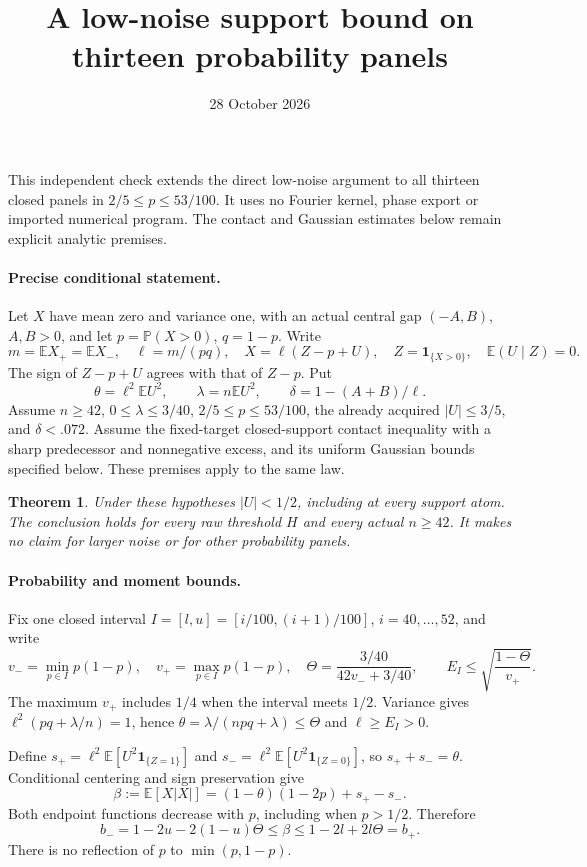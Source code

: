 \documentclass[10pt]{article}
\title{A low-noise support bound on thirteen probability panels}
\author{}\date{28 October 2026}
\newcommand{\E}{\mathbb E}\newcommand{\Pp}{\mathbb P}
\newtheorem{theorem}{Theorem}
\begin{document}
\maketitle
\noindent This independent check extends the direct low-noise argument to
all thirteen closed panels in \(2/5\le p\le53/100\). It uses no Fourier
kernel, phase export or imported numerical program. The contact and
Gaussian estimates below remain explicit analytic premises.

\paragraph{Precise conditional statement.}
Let \(X\) have mean zero and variance one, with an actual central gap
\((-A,B)\), \(A,B>0\), and let \(p=\Pp(X>0)\), \(q=1-p\).
Write
\[
 m=\E X_+=\E X_-,\quad \ell=m/(pq),\quad
 X=\ell(Z-p+U),\quad Z=\mathbf1_{\{X>0\}},\quad
 \E(U\mid Z)=0 .
\]
The sign of \(Z-p+U\) agrees with that of \(Z-p\). Put
\[
 \theta=\ell^2\E U^2,\qquad \lambda=n\E U^2,\qquad
 \delta=1-(A+B)/\ell.
\]
Assume \(n\ge42\), \(0\le\lambda\le3/40\),
\(2/5\le p\le53/100\), the already acquired
\(|U|\le3/5\), and \(\delta<.072\).
Assume the fixed-target closed-support contact inequality with a sharp
predecessor and nonnegative excess, and its uniform Gaussian bounds
specified below. These premises apply to the same law.
\begin{theorem}
Under these hypotheses \(|U|<1/2\), including at every support atom.
The conclusion holds for every raw threshold \(H\) and every actual
\(n\ge42\). It makes no claim for larger noise or for other probability
panels.
\end{theorem}

\paragraph{Probability and moment bounds.}
Fix one closed interval \(I=[l,u]=[i/100,(i+1)/100]\),
\(i=40,\ldots,52\), and write
\[
 v_-=\min_{p\in I}p(1-p),\quad v_+=\max_{p\in I}p(1-p),\quad
 \Theta=\frac{3/40}{42v_-+3/40},\qquad
 E_I\le\sqrt{\frac{1-\Theta}{v_+}}.
\]
The maximum \(v_+\) includes \(1/4\) when the interval meets \(1/2\).
Variance gives \(\ell^2(pq+\lambda/n)=1\), hence
\(\theta=\lambda/(npq+\lambda)\le\Theta\) and \(\ell\ge E_I>0\).

Define \(s_+=\ell^2\E[U^2\mathbf1_{\{Z=1\}}]\) and
\(s_-=\ell^2\E[U^2\mathbf1_{\{Z=0\}}]\), so
\(s_++s_-=\theta\).
Conditional centering and sign preservation give
\[
 \beta:=\E[X|X|]=(1-\theta)(1-2p)+s_+-s_-.
\]
Both endpoint functions decrease with \(p\), including when \(p>1/2\).
Therefore
\[
 b_-=1-2u-2(1-u)\Theta\le\beta
 \le1-2l+2l\Theta=b_+ .                                      \tag{1}
\]
There is no reflection of \(p\) to \(\min(p,1-p)\).
\end{document}
